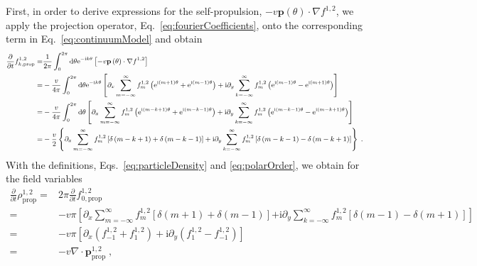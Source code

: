 \documentclass{article}
\begin{document}
First, in order to derive expressions for the self-propulsion, $-v\mathbf{p}\left( \theta \right) \cdot \nabla f^{1,2}$, we apply the projection operator, Eq.~\eqref{eq:fourierCoefficients}, onto the corresponding term in Eq.~\eqref{eq:continuumModel} and obtain
\begin{equation}
    \small
    \begin{aligned}
        \frac{\partial}{\partial t}f_{k,\mathrm{prop}}^{1,2}=&\frac{1}{2\pi}\int_0^{2\pi}{\mathrm{d}\theta \mathrm{e}^{-\mathrm{i}k\theta}\left[ -v\mathbf{p}\left( \theta \right) \cdot \nabla f^{1,2} \right]}\\
        =&-\frac{v}{4\pi}\int_0^{2\pi}{\mathrm{d}\theta \mathrm{e}^{-\mathrm{i}k\theta}\left[ \partial _x\sum_{m=-\infty}^{\infty}{f_{m}^{1,2}\left( \mathrm{e}^{\mathrm{i}\left( m+1 \right) \theta}+\mathrm{e}^{\mathrm{i}\left( m-1 \right) \theta} \right)}+\mathrm{i}\partial _y\sum_{k=-\infty}^{\infty}{f_{m}^{1,2}\left( \mathrm{e}^{\mathrm{i}\left( m-1 \right) \theta}-\mathrm{e}^{\mathrm{i}\left( m+1 \right) \theta} \right)} \right]}\\
        =&-\frac{v}{4\pi}\int_0^{2\pi}{\mathrm{d}\theta \left[ \partial _x\sum_{m=-\infty}^{\infty}{f_{m}^{1,2}\left( \mathrm{e}^{\mathrm{i}\left( m-k+1 \right) \theta}+\mathrm{e}^{\mathrm{i}\left( m-k-1 \right) \theta} \right)}+\mathrm{i}\partial _y\sum_{k=-\infty}^{\infty}{f_{m}^{1,2}\left( \mathrm{e}^{\mathrm{i}\left( m-k-1 \right) \theta}-\mathrm{e}^{\mathrm{i}\left( m-k+1 \right) \theta} \right)} \right]}\\
        =&-\frac{v}{2}\left\{ \partial _x\sum_{m=-\infty}^{\infty}{f_{m}^{1,2}\left[ \delta \left( m-k+1 \right) +\delta \left( m-k-1 \right) \right] +\mathrm{i}\partial _y\sum_{k=-\infty}^{\infty}{f_{m}^{1,2}\left[ \delta \left( m-k-1 \right) -\delta \left( m-k+1 \right) \right]}} \right\} \;.\\
    \end{aligned}
\end{equation}
With the definitions, Eqs.~\eqref{eq:particleDensity} and \eqref{eq:polarOrder}, we obtain for the field variables
\begin{equation}
    \begin{aligned}
        \frac{\partial}{\partial t}\rho _{\mathrm{prop}}^{1,2}=&2\pi \frac{\partial}{\partial t}f_{0,\mathrm{prop}}^{1,2}\\
        =&-v\pi \left[ \partial _x\sum_{m=-\infty}^{\infty}{f_{m}^{1,2}}\left[ \delta \left( m+1 \right) +\delta \left( m-1 \right) \right] \right.\left. +\mathrm{i}\partial _y\sum_{k=-\infty}^{\infty}{f_{m}^{1,2}}\left[ \delta \left( m-1 \right) -\delta \left( m+1 \right) \right] \right]\\
        =&-v\pi \left[ \partial _x\left( f_{-1}^{1,2}+f_{1}^{1,2} \right) +\mathrm{i}\partial _y\left( f_{1}^{1,2}-f_{-1}^{1,2} \right) \right]\\
        =&-v\nabla \cdot \boldsymbol{p}_{\mathrm{prop}}^{1,2}\;,\\
    \end{aligned}
\end{equation}
\end{document}
